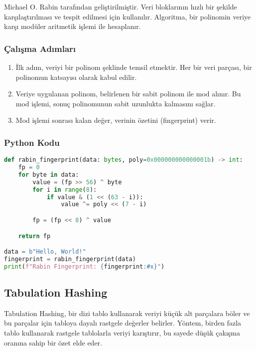 Michael O. Rabin tarafından geliştirilmiştir. Veri bloklarının hızlı bir şekilde karşılaştırılması ve tespit edilmesi için kullanılır. Algoritma, bir polinomin veriye karşı modüler aritmetik işlemi ile hesaplanır. 

\subsubsection{Çalışma Adımları}

\begin{enumerate}
    \item İlk adım, veriyi bir polinom şeklinde temsil etmektir. Her bir veri parçası, bir polinomun katsayısı olarak kabul edilir.
    \item Veriye uygulanan polinom, belirlenen bir sabit polinom ile mod alınır. Bu mod işlemi, sonuç polinomunun sabit uzunlukta kalmasını sağlar.
    \item Mod işlemi sonrası kalan değer, verinin özetini (fingerprint) verir.
\end{enumerate}

\subsubsection{Python Kodu}

\begin{lstlisting}[language=Python]
def rabin_fingerprint(data: bytes, poly=0x000000000000001b) -> int:
    fp = 0
    for byte in data:
        value = (fp >> 56) ^ byte
        for i in range(8):
            if value & (1 << (63 - i)):
                value ^= poly << (7 - i)

        fp = (fp << 8) ^ value

    return fp

data = b"Hello, World!"
fingerprint = rabin_fingerprint(data)
print(f"Rabin Fingerprint: {fingerprint:#x}")
\end{lstlisting}

\newpage

\subsection{Tabulation Hashing}

Tabulation Hashing, bir dizi tablo kullanarak veriyi küçük alt parçalara böler ve bu parçalar için tabloya dayalı rastgele değerler belirler. Yöntem, birden fazla tablo kullanarak rastgele tablolarla veriyi karıştırır, bu sayede düşük çakışma oranına sahip bir özet elde eder.

